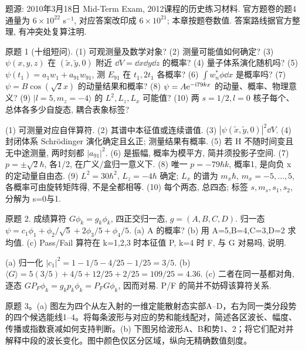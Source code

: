 题源: 2010年3月18日 Mid-Term Exam, 2012课程的历史练习材料. 官方题卷的题4通量为 $6\times10^{22}$ s$^{-1}$, 对应答案改印成 $6\times10^{21}$; 本章按题卷数值. 答案路线据官方整理, 有冲突处复算注明.
\begin{exercise}\label{ex:2202-e2010-1}
原题 1 (十组短问). (1) 可观测量及数学对象? (2) 测量可能值如何确定? (3) $\psi(x,y,z)$ 在 $(\widetilde x,\widetilde y,0)$ 附近 $\dd V=\dd x\dd y\dd z$ 的概率? (4) 量子体系演化随机吗? (5) $\psi(t_1)=a_1w_1+a_{91}w_{91}$, 测 $E_{91}$ 在 $t_1,2t_1$ 各概率? (6) $\int w_n^*\phi\dd x$ 是概率吗? (7) $\psi=B\cos(\sqrt2x)$ 的动量结果和概率? (8) $\psi=A\mathrm e^{-\mathrm i79kx}$ 的动量、概率、物理意义? (9) $|l=5,m_z=-4\rangle$ 的 $L^2,L_z,L_x$ 可能值? (10) 两 $s=1/2,l=0$ 核子每个、总体各多少自旋态, 耦合表象标签?
\end{exercise}
\begin{solution}
(1) 可测量对应自伴算符. (2) 其谱中本征值或连续谱值. (3) $|\psi(\widetilde x,\widetilde y,0)|^2\dd V$. (4) 封闭体系 Schrödinger 演化确定且幺正; 测量结果有概率. (5) 若 H 不随时间变且无中途测量, 两时刻都 $|a_{91}|^2$. (6) 是振幅, 概率为模平方, 简并须投影子空间. (7) $p=\pm\sqrt2\hbar$, 各1/2, 在广义/盒归一意义下. (8) 唯一 $p=-79\hbar k$, 概率1, 是向负 x 的定动量自由态. (9) $L^2=30\hbar^2$, $L_z=-4\hbar$ 确定; $L_x$ 的谱为 $m_x\hbar$, $m_x=-5,\ldots,5$, 各概率可由旋转矩阵得, 不是全都相等. (10) 每个两态, 总四态; 标签 $s,m_s,s_1,s_2$, 分解为 s=0与1.
\end{solution}
\begin{exercise}\label{ex:2202-e2010-2}
原题 2. 成绩算符 $G\phi_k=g_k\phi_k$, 四正交归一态, $g=(A,B,C,D)$. 归一态 $\psi=c_1\phi_1+\phi_2/\sqrt5+2\phi_3/5+\phi_4/5$. (a) A 的概率? (b) 用 A=5,B=4,C=3,D=2 求均值. (c) Pass/Fail 算符在 k=1,2,3 时本征值 P, k=4 时 F, 与 G 对易吗, 说明.
\end{exercise}
\begin{solution}
(a) 归一化 $|c_1|^2=1-1/5-4/25-1/25=3/5$. (b) $\langle G\rangle=5(3/5)+4/5+12/25+2/25=109/25=4.36$. (c) 二者在同一基都对角, 逐态 $GP_F\phi_k=g_kp_k\phi_k=P_FG\phi_k$, 因而对易. P/F 的简并不妨碍该算符关系.
\end{solution}
\begin{exercise}\label{ex:2202-e2010-3}
原题 3。(a) 图左为四个从左入射的一维定能散射态实部A--D，右为同一类分段势的四个候选能线1--4。将每条波形与对应的势和能线配对，简述各区波长、幅度、传播或指数衰减如何支持判断。(b) 下图另给波形A、B和势1、2；将它们配对并解释中段的波长变化。图中颜色仅区分区域，纵向无精确数值刻度。
\end{exercise}
